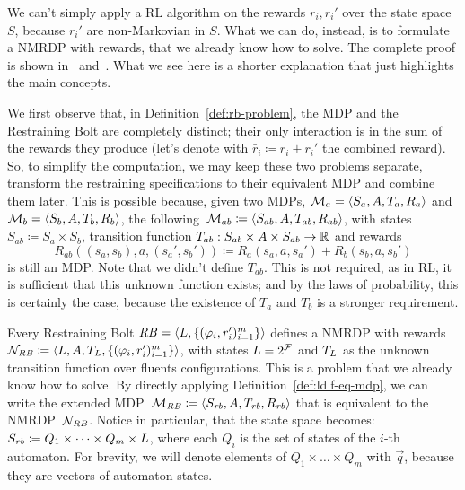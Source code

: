 We can't simply apply a RL algorithm on the rewards $r_i, r_i'$ over the state
space~$S$, because $r_i'$ are non-Markovian in $S$. What we can do, instead,
is to formulate a NMRDP with \ldl{} rewards, that we already know how to
solve. The complete proof is shown in~\cite{bib:bolt}
and~\cite{bib:favorito-thesis}.	What we see here is a shorter explanation that
just highlights the main concepts.

We first observe that, in Definition~\ref{def:rb-problem}, the MDP and the
Restraining Bolt are completely distinct; their only interaction is in the sum
of the rewards they produce (let's denote with $\bar{r}_i \coloneqq r_i +
r_i'$ the combined reward). So, to simplify the computation, we may keep
these two problems separate, transform the restraining specifications to their
equivalent MDP and combine them later. This is possible because, given two
MDPs, $\mathcal{M}_a = \langle S_a, A, T_a, R_a \rangle$ and $\mathcal{M}_b = \langle S_b,
A, T_b, R_b \rangle$, the following~$\mathcal{M}_{ab} \coloneqq \langle S_{ab}, A,
T_{ab}, R_{ab} \rangle$, with states $S_{ab} \coloneqq S_a \times S_b$,
transition function $T_{ab}: S_{ab} \times A \times S_{ab} \to \mathbb{R}$ and rewards
\[
	R_{ab}((s_a, s_b), a, (s_a', s_b')) \coloneqq R_a(s_{a}, a, s_{a}') +
	R_b(s_{b}, a, s_{b}')
\]
is still an MDP.  Note that we didn't define $T_{ab}$. This is not required,
as in RL, it is sufficient that this unknown function exists; and by the laws
of probability, this is certainly the case, because the existence of $T_a$ and
$T_b$ is a stronger requirement.

Every Restraining Bolt $\text{\textit{RB}} = \langle L, \{(\varphi_i,
r_i')_{i=1}^m\} \rangle$ defines a NMRDP with \ldl{} rewards
$\mathcal{N}_{\text{\textit{RB}}} \coloneqq \langle L, A, T_L,
\{(\varphi_i, r_i')_{i=1}^m\} \rangle$, with states $L =
2^{\mathcal{F}}$ and $T_L$ as the unknown transition function over
fluents configurations. This is a problem that we already know how to solve.
By directly applying Definition~\ref{def:ldlf-eq-mdp}, we can write the
extended MDP~$\mathcal{M}_{\text{\textit{RB}}} \coloneqq \langle S_{\text{\textit{rb}}}, A,
T_{\text{\textit{rb}}}, R_{\text{\textit{rb}}} \rangle$ that is equivalent to the
NMRDP~$\mathcal{N}_{\text{\textit{RB}}}$. Notice in particular, that the state space
becomes: $S_{\text{\textit{rb}}} \coloneqq Q_1 \times \dots \times Q_m \times
L$, where each $Q_i$ is the set of states of the $i$-th automaton.
For brevity, we will denote elements of $Q_1 \times \dots \times Q_m$ with
$\vec{q}$, because they are vectors of automaton states.


